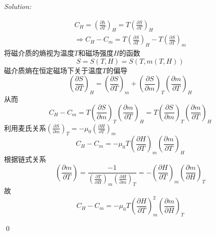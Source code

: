 \documentclass[12pt,a4paper]{article}
\newenvironment{sol}
    {\emph{Solution:}
    }
    {
    \qed
    }
\begin{document}
\begin{sol}
\begin{gather}
C_H=\left(\frac{\partial h}{\partial T}\right)_H=T\left(\frac{\partial S}{\partial T}\right)_H\\
\Longrightarrow C_H-C_m=T\left(\frac{\partial S}{\partial T}\right)_H-T\left(\frac{\partial S}{\partial T}\right)_m
\end{gather}
将磁介质的熵视为温度$T$和磁场强度$H$的函数
\begin{equation}
S=S(T,H)=S(T,m(T,H))
\end{equation}
磁介质熵在恒定磁场下关于温度$T$的偏导
\begin{equation}
\left(\frac{\partial S}{\partial T}\right)_H=\left(\frac{\partial S}{\partial T}\right)_m+\left(\frac{\partial S}{\partial m}\right)_T\left(\frac{\partial m}{\partial T}\right)_H
\end{equation}
从而
\begin{equation}
C_H-C_m=T\left(\frac{\partial S}{\partial m}\right)_T\left(\frac{\partial m}{\partial T}\right)_H=T\left(\frac{\partial S}{\partial m}\right)_T\left(\frac{\partial m}{\partial T}\right)_H
\end{equation}
利用麦氏关系$\left(\frac{\partial S}{\partial m}\right)_T=-\mu_0\left(\frac{\partial H}{\partial T}\right)_m$
\begin{equation}
C_H-C_m=-\mu_0T\left(\frac{\partial H}{\partial T}\right)_m\left(\frac{\partial m}{\partial T}\right)_H
\end{equation}
根据链式关系
\begin{equation}
\left(\frac{\partial m}{\partial T}\right)=\frac{-1}{\left(\frac{\partial T}{\partial H}\right)_m\left(\frac{\partial H}{\partial m}\right)_T}=-\left(\frac{\partial H}{\partial T}\right)_m\left(\frac{\partial m}{\partial H}\right)_T
\end{equation}
故
\begin{equation}
C_H-C_m=-\mu_0T\left(\frac{\partial H}{\partial T}\right)_m^2\left(\frac{\partial m}{\partial H}\right)_T
\end{equation}
\end{sol}
\end{document}

